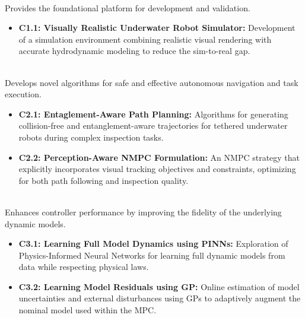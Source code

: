 \begin{description}[leftmargin=1cm, style=unboxed, font=\normalfont] %

    \item[\textcolor{blue}{\textbf{[C1] Simulation Infrastructure}}] \hfill \\
        Provides the foundational platform for development and validation.
        \begin{itemize}[leftmargin=0.5cm, itemsep=0pt]
            \item \textbf{C1.1: Visually Realistic Underwater Robot Simulator:} Development of a simulation environment combining realistic visual rendering with accurate hydrodynamic modeling to reduce the sim-to-real gap.
        \end{itemize}

    \item[\textcolor{blue}{\textbf{[C2] Control and Planning}}] \hfill \\
        Develops novel algorithms for safe and effective autonomous navigation and task execution.
        \begin{itemize}[leftmargin=0.5cm, itemsep=0pt]
            \item \textbf{C2.1: Entaglement-Aware Path Planning:} Algorithms for generating collision-free and entanglement-aware trajectories for tethered underwater robots during complex inspection tasks.
            \item \textbf{C2.2: Perception-Aware \ac{NMPC} Formulation:} An \ac{NMPC} strategy that explicitly incorporates visual tracking objectives and constraints, optimizing for both path following and inspection quality.
        \end{itemize}

    \item[\textcolor{blue}{\textbf{[C3] Model Learning}}] \hfill \\
        Enhances controller performance by improving the fidelity of the underlying dynamic models.
         \begin{itemize}[leftmargin=0.5cm, itemsep=0pt]
            \item \textbf{C3.1: Learning Full Model Dynamics using PINNs:} Exploration of Physics-Informed Neural Networks for learning full dynamic models from data while respecting physical laws.
            \item \textbf{C3.2: Learning Model Residuals using GP:} Online estimation of model uncertainties and external disturbances using \acp{GP} to adaptively augment the nominal model used within the \ac{MPC}.
        \end{itemize}
\end{description}

